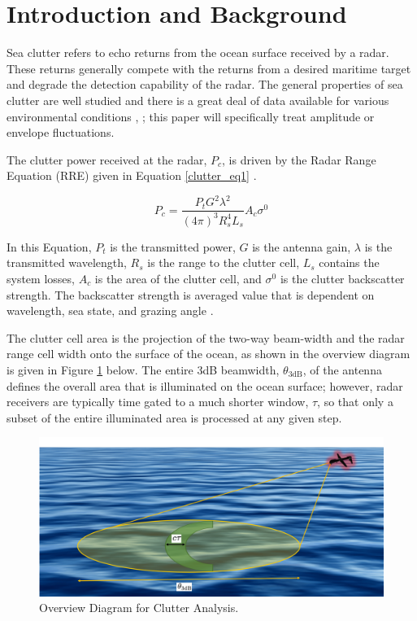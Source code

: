 \documentclass[12pt,twoside]{paper}
\begin{document}
\section{Introduction and Background}
Sea clutter refers to echo returns from the ocean surface received by a radar. These returns generally compete with the returns from a desired maritime target and degrade the detection capability of the radar. The general properties of sea clutter are well studied and there is a great deal of data available for various environmental conditions \cite{nathanson_radar}, \cite{blake_radar}; this paper will specifically treat amplitude or envelope fluctuations.

The clutter power received at the radar, $P_c$, is driven by the Radar Range Equation (RRE) given in Equation \ref{clutter_eq1} \cite{nathanson_radar}.

\begin{equation}
\label{clutter_eq1}
P_c = \frac{P_tG^2\lambda^2}{(4\pi)^3R_s^4L_s}A_c\sigma^0
\end{equation}

In this Equation, $P_t$ is the transmitted power, $G$ is the antenna gain, $\lambda$ is the transmitted wavelength, $R_s$ is the range to the clutter cell, $L_s$ contains the system losses, $A_c$ is the area of the clutter cell, and $\sigma^0$ is the clutter backscatter strength. The backscatter strength is averaged value that is dependent on wavelength, sea state, and grazing angle \cite{gregers-hansen_clutter}. 

The clutter cell area is the projection of the two-way beam-width and the radar range cell width onto the surface of the ocean, as shown in the overview diagram is given in Figure \ref{clutter_fig1} below. The entire 3dB beamwidth, $\theta_{3\text{dB}}$, of the antenna defines the overall area that is illuminated on the ocean surface; however, radar receivers are typically time gated to a much shorter window, $\tau$, so that only a subset of the entire illuminated area is processed at any given step.

\begin{figure}[!h]
\centering
\includegraphics[width=6in]{overview.png}
\caption{Overview Diagram for Clutter Analysis.}
\label{clutter_fig1}
\end{figure}
\end{document}
